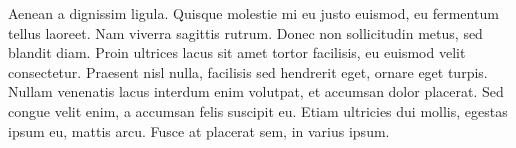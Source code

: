 Aenean a dignissim ligula. Quisque molestie mi eu justo euismod, eu fermentum tellus laoreet. Nam viverra sagittis rutrum. Donec non sollicitudin metus, sed blandit diam. Proin ultrices lacus sit amet tortor facilisis, eu euismod velit consectetur. Praesent nisl nulla, facilisis sed hendrerit eget, ornare eget turpis. Nullam venenatis lacus interdum enim volutpat, et accumsan dolor placerat. Sed congue velit enim, a accumsan felis suscipit eu. Etiam ultricies dui mollis, egestas ipsum eu, mattis arcu. Fusce at placerat sem, in varius ipsum.